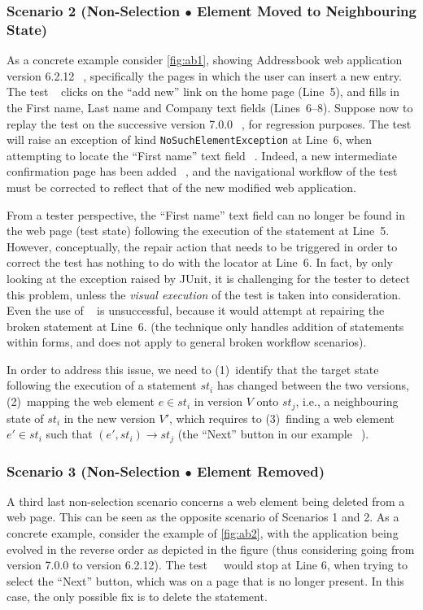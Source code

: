 \subsubsection{Scenario 2 (Non-Selection $\bullet$ Element Moved to Neighbouring State)}
As a concrete example consider \autoref{fig:ab1}, showing Addressbook web application version 6.2.12~\textcircled{}, specifically the pages in which the user can insert a new entry. The test~\textcircled{} clicks on the ``add new'' link on the home page (Line~5), and fills in the First name, Last name and Company text fields (Lines~6--8).
Suppose now to replay the test on the successive version 7.0.0~\textcircled{}, for regression purposes. The test will raise an exception of kind \texttt{NoSuchElementException} at Line~6, when attempting to locate the ``First name'' text field~\textcircled{}. 
Indeed, a new intermediate confirmation page has been added~\textcircled{}, and the navigational workflow of the test must be corrected to reflect that of the new modified web application.

From a tester perspective, the ``First name'' text field can no longer be found in the web page (test state) following the execution of the statement at Line~5. However, conceptually, the repair action that needs to be triggered in order to correct the test has nothing to do with the locator at Line~6.
In fact, by only looking at the exception raised by JUnit, it is  challenging for the tester to detect this problem, unless the \textit{visual execution} of the test is taken into consideration.
%
Even the use of \water~\cite{Choudhary:2011:WWA:2002931.2002935} is unsuccessful, because it would attempt at repairing the broken statement at Line~6. (the technique only handles addition of statements within forms, and does not apply to general broken workflow scenarios).

In order to address this issue, we need to (1)~identify that the target state following the execution of a statement $st_i$ has changed between the two versions, (2)~mapping the web element $e \in st_i$ in version $V$ onto $st_j$, i.e., a neighbouring state of $st_i$  in the new version $V'$, which requires to (3)~finding  a web element $e' \in st_i$ such that $(e', st_i) \rightarrow st_j$ (the ``Next'' button in our example~\textcircled{}).

\subsubsection{Scenario 3 (Non-Selection $\bullet$ Element Removed)} 
%
A third last non-selection scenario concerns a web element being deleted from a web page. This can be seen as the opposite scenario of Scenarios 1 and 2. 
As a concrete example, consider the example of \autoref{fig:ab2}, with the application being evolved in the reverse order as depicted in the figure (thus considering going from version 7.0.0 to version 6.2.12). The test ~\textcircled{} would stop at Line 6, when trying to select the ``Next'' button, which was on a page that is no longer present. In this case, the only possible fix is to delete the statement.

